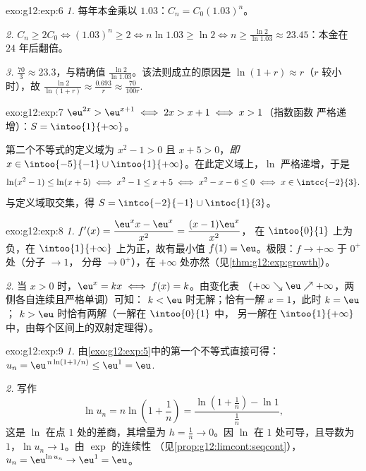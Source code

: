 \begin{solution}{exo:g12:exp:6}
\emph{1.} 每年本金乘以 $1.03$：$C_n = C_0 (1.03)^n$。

\emph{2.} $C_n \geq 2C_0 \iff (1.03)^n \geq 2 \iff n \ln 1.03 \geq \ln 2
\iff n \geq \frac{\ln 2}{\ln 1.03} \approx 23.45$：本金在
$24$ 年后翻倍。

\emph{3.} $\frac{70}{3} \approx 23.3$，与精确值
$\frac{\ln 2}{\ln 1.03}$。该法则成立的原因是
$\ln(1 + r) \approx r$（$r$ 较小时），故
$\frac{\ln 2}{\ln(1+r)} \approx \frac{0.693}{r} \approx \frac{70}{100r}$.
\end{solution}

\begin{solution}{exo:g12:exp:7}
$\eu^{2x} > \eu^{x+1} \iff 2x > x + 1 \iff x > 1$（指数函数
严格递增）：$S = \intoo{1}{+\infty}$。

第二个不等式的定义域为 $x^2 - 1 > 0$ 且 $x + 5 > 0$，\emph{即}
$x \in \intoo{-5}{-1} \cup \intoo{1}{+\infty}$。在此定义域上，$\ln$
严格递增，于是
\[
\ln(x^2-1) \leq \ln(x+5) \iff x^2 - 1 \leq x + 5 \iff x^2 - x - 6 \leq 0
\iff x \in \intcc{-2}{3}.
\]
与定义域取交集，得 $S = \intco{-2}{-1} \cup \intoc{1}{3}$。
\end{solution}

\begin{solution}{exo:g12:exp:8}
\emph{1.} $f'(x) = \dfrac{\eu^x x - \eu^x}{x^2} = \dfrac{(x-1)\eu^x}{x^2}$，
在 $\intoo{0}{1}$ 上为负，在 $\intoo{1}{+\infty}$ 上为正，故有最小值
$f(1) = \eu$。极限：$f \to +\infty$ 于 $0^+$ 处（分子 $\to 1$，
分母 $\to 0^+$），在 $+\infty$ 处亦然（见\cref{thm:g12:exp:growth}）。

\emph{2.} 当 $x > 0$ 时，$\eu^x = kx \iff f(x) = k$。由变化表
（$+\infty \searrow \eu \nearrow +\infty$，两侧各自连续且严格单调）可知：
$k < \eu$ 时无解；恰有一解 $x = 1$，此时 $k = \eu$；
$k > \eu$ 时恰有两解（一解在 $\intoo{0}{1}$ 中，
另一解在 $\intoo{1}{+\infty}$ 中，由每个区间上的双射定理得）。
\end{solution}

\begin{solution}{exo:g12:exp:9}
\emph{1.} 由\cref{exo:g12:exp:5}中的第一个不等式直接可得：
$u_n = \eu^{\,n\ln(1+1/n)} \leq \eu^1 = \eu$.

\emph{2.} 写作
\[
\ln u_n = n \ln\!\left(1 + \frac1n\right)
= \frac{\ln\!\left(1 + \frac1n\right) - \ln 1}{\frac1n},
\]
这是 $\ln$ 在点 $1$ 处的差商，其增量为
$h = \frac1n \to 0$。因 $\ln$ 在 $1$ 处可导，且导数为
$1$，$\ln u_n \to 1$。由 $\exp$ 的连续性
（见\cref{prop:g12:limcont:seqcont}），$u_n = \eu^{\ln u_n} \to \eu^1 = \eu$。
\end{solution}

